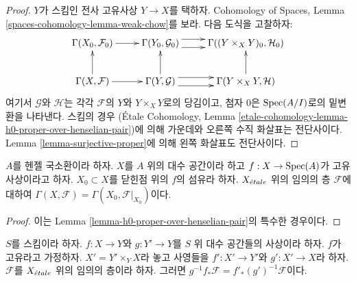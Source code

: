 \begin{proof}
$Y$가 스킴인 전사 고유사상 $Y \to X$를 택하자.
Cohomology of Spaces, Lemma
\ref{spaces-cohomology-lemma-weak-chow}를 보라.
다음 도식을 고찰하자:
$$
\xymatrix{
\Gamma(X_0, \mathcal{F}_0) \ar[r] &
\Gamma(Y_0, \mathcal{G}_0) \ar@<1ex>[r] \ar@<-1ex>[r] &
\Gamma((Y \times_X Y)_0, \mathcal{H}_0) \\
\Gamma(X, \mathcal{F}) \ar[r] \ar[u] &
\Gamma(Y, \mathcal{G}) \ar@<1ex>[r] \ar@<-1ex>[r] \ar[u] &
\Gamma(Y \times_X Y, \mathcal{H}) \ar[u]
}
$$
여기서 $\mathcal{G}$와 $\mathcal{H}$는 각각 $\mathcal{F}$의
$Y$와 $Y \times_X Y$로의 당김이고,
첨자 $0$은 $\mathop{\mathrm{Spec}}(A/I)$로의 밑변환을 나타낸다.
스킴의 경우
(\'Etale Cohomology, Lemma
\ref{etale-cohomology-lemma-h0-proper-over-henselian-pair})에 의해
가운데와 오른쪽 수직 화살표는 전단사이다.
Lemma \ref{lemma-surjective-proper}에 의해 왼쪽 화살표도 전단사이다.
\end{proof}

\begin{lemma}
\label{lemma-h0-proper-over-henselian-local}
$A$를 헨젤 국소환이라 하자. $X$를 $A$ 위의 대수 공간이라 하고
$f : X \to \mathop{\mathrm{Spec}}(A)$가 고유사상이라고 하자.
$X_0 \subset X$를 닫힌점 위의 $f$의 섬유라 하자.
$X_{\acute{e}tale}$ 위의 임의의 층 $\mathcal{F}$에 대하여
$\Gamma(X, \mathcal{F}) = \Gamma(X_0, \mathcal{F}|_{X_0})$이다.
\end{lemma}

\begin{proof}
이는 Lemma \ref{lemma-h0-proper-over-henselian-pair}의 특수한 경우이다.
\end{proof}

\begin{lemma}
\label{lemma-proper-base-change-f-star}
$S$를 스킴이라 하자. $f : X \to Y$와 $g : Y' \to Y$를
$S$ 위 대수 공간들의 사상이라 하자.
$f$가 고유라고 가정하자.
$X' = Y' \times_Y X$라 놓고 사영들을
$f' : X' \to Y'$와 $g' : X' \to X$라 하자.
$\mathcal{F}$를 $X_{\acute{e}tale}$ 위의 임의의 층이라 하자. 그러면
$g^{-1}f_*\mathcal{F} = f'_*(g')^{-1}\mathcal{F}$이다.
\end{lemma}

